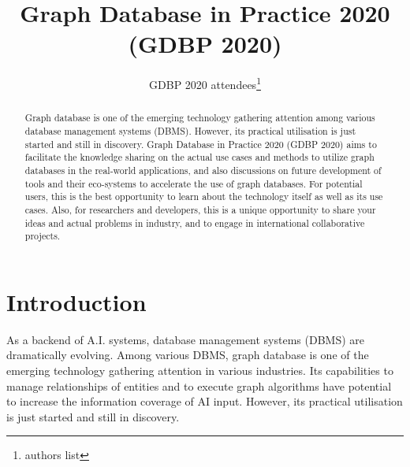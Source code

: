 \documentclass[runningheads]{llncs}
\begin{document}
\newtheorem{defi}[theorem]{Definition}
%
\title{Graph Database in Practice 2020 (GDBP 2020)}
%
%
\author{GDBP 2020 attendees\thanks{authors list}}
%
%

%
\maketitle              %
%
\begin{abstract}
Graph database is one of the emerging technology gathering attention among various database management systems (DBMS). However, its practical utilisation is just started and still in discovery. Graph Database in Practice 2020 (GDBP 2020) aims to facilitate the knowledge sharing on the actual use cases and methods to utilize graph databases in the real-world applications, and also discussions on future development of tools and their eco-systems to accelerate the use of graph databases. For potential users, this is the best opportunity to learn about the technology itself as well as its use cases. Also, for researchers and developers, this is a unique opportunity to share your ideas and actual problems in industry, and to engage in international collaborative projects.

\end{abstract}

\section{Introduction}

As a backend of A.I. systems, database management systems (DBMS) are dramatically evolving. Among various DBMS, graph database is one of the emerging technology gathering attention in various industries. Its capabilities to manage relationships of entities and to execute graph algorithms have potential to increase the information coverage of AI input. However, its practical utilisation is just started and still in discovery. 
\end{document}
